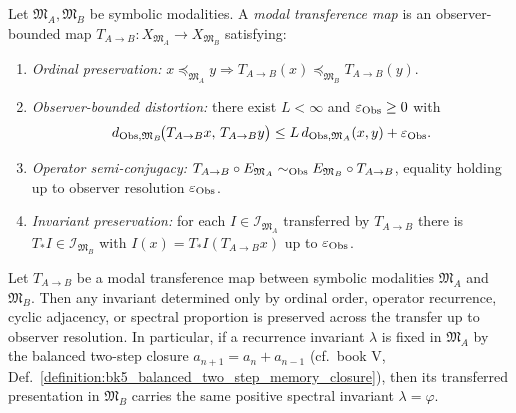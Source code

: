 \begin{definition}
\label{definition:appC_modal_transference_map}
Let $\mathfrak{M}_A,\mathfrak{M}_B$ be symbolic modalities. A \emph{modal
transference map} is an observer-bounded map
$T_{A\to B}:X_{\mathfrak{M}_A}\to X_{\mathfrak{M}_B}$ satisfying:
\begin{enumerate}
\item \emph{Ordinal preservation:}
$x\preceq_{\mathfrak{M}_A}y \Rightarrow T_{A\to B}(x)\preceq_{\mathfrak{M}_B}T_{A\to B}(y)$.
\item \emph{Observer-bounded distortion:} there exist $L<\infty$ and
$\varepsilon_{\mathrm{Obs}}\ge 0$ with
\[
d_{\mathrm{Obs},\mathfrak{M}_B}\!\big(T_{A\to B}x,\,T_{A\to B}y\big)
\le L\, d_{\mathrm{Obs},\mathfrak{M}_A}(x,y) + \varepsilon_{\mathrm{Obs}}.
\]
\item \emph{Operator semi-conjugacy:}
$T_{A\to B}\circ E_{\mathfrak{M}_A} \sim_{\mathrm{Obs}} E_{\mathfrak{M}_B}\circ T_{A\to B}$,
equality holding up to observer resolution $\varepsilon_{\mathrm{Obs}}$.
\item \emph{Invariant preservation:} for each $I\in\mathcal{I}_{\mathfrak{M}_A}$
transferred by $T_{A\to B}$ there is $T_*I\in\mathcal{I}_{\mathfrak{M}_B}$ with
$I(x)=T_*I(T_{A\to B}x)$ up to $\varepsilon_{\mathrm{Obs}}$.
\end{enumerate}
\end{definition}

\begin{theorem}
\label{theorem:appC_modal_transference}
Let $T_{A\to B}$ be a modal transference map between symbolic modalities
$\mathfrak{M}_A$ and $\mathfrak{M}_B$. Then any invariant determined only by
ordinal order, operator recurrence, cyclic adjacency, or spectral proportion is
preserved across the transfer up to observer resolution. In particular, if a
recurrence invariant $\lambda$ is fixed in $\mathfrak{M}_A$ by the balanced
two-step closure $a_{n+1}=a_n+a_{n-1}$
(cf.~book V, Def.~\ref{definition:bk5_balanced_two_step_memory_closure}), then its
transferred presentation in $\mathfrak{M}_B$ carries the same positive spectral
invariant $\lambda=\varphi$.
\end{theorem}

